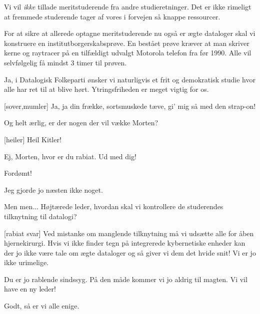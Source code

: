 \documentclass[a4paper,11pt]{article}
\begin{document}
\begin{sketch}
 Vi vil \emph{ikke} tillade meritstuderende fra andre studieretninger. Det er ikke rimeligt at fremmede studerende tager af vores i forvejen så knappe ressourcer.

 For at sikre at allerede optagne meritstuderende nu også er ægte dataloger skal vi konstruere en institutborgerskabsprøve. En bestået prøve kræver at man skriver kerne og raytracer på en tilfældigt udvalgt Motorola telefon fra før 1990. Alle vil selvfølgelig få mindst 3 timer til prøven.

 Ja, i Datalogisk Folkeparti ønsker vi naturligvis et frit og demokratisk studie hvor alle har ret til at blive hørt. Ytringsfriheden er meget vigtig for os.

[sover,mumler] Ja, ja din frække, sortsmuskede tæve, gi' mig så med den strap-on!

 Og helt ærlig, er der nogen der vil vække Morten?


[heiler] Heil Kitler!

 Ej, Morten, hvor er du rabiat. Ud med dig!

 Fordømt! 

 Jeg gjorde jo næsten ikke noget.

 Men men... Højtærede leder, hvordan skal vi kontrollere de studerendes tilknytning til datalogi?

[rabiat svar] Ved mistanke om manglende tilknytning må vi udsætte alle for åben hjernekirurgi. Hvis vi ikke finder tegn på integrerede kybernetiske enheder kan der jo ikke være tale om ægte dataloger og så giver vi dem det hvide snit! Vi er jo ikke urimelige.

 Du er jo rablende sindssyg. På den måde kommer vi jo aldrig til magten. Vi vil have en ny leder!




 Godt, så er vi alle enige.


\end{sketch}
\end{document}
